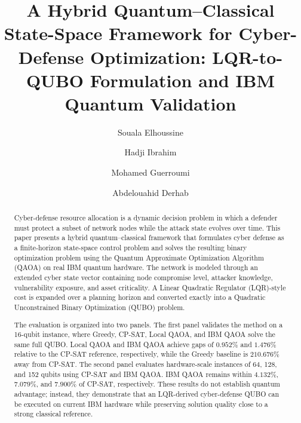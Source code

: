 \documentclass[runningheads]{llncs}
\begin{document}
\title{A Hybrid Quantum--Classical State-Space Framework for Cyber-Defense Optimization: LQR-to-QUBO Formulation and IBM Quantum Validation}


\author{
Souala Elhoussine \and
Hadji Ibrahim \and
Mohamed Guerroumi \and
Abdelouahid Derhab
}



\maketitle

\begin{abstract}
Cyber-defense resource allocation is a dynamic decision problem in which a defender must protect a subset of network nodes while the attack state evolves over time. This paper presents a hybrid quantum--classical framework that formulates cyber defense as a finite-horizon state-space control problem and solves the resulting binary optimization problem using the Quantum Approximate Optimization Algorithm (QAOA) on real IBM quantum hardware. The network is modeled through an extended cyber state vector containing node compromise level, attacker knowledge, vulnerability exposure, and asset criticality. A Linear Quadratic Regulator (LQR)-style cost is expanded over a planning horizon and converted exactly into a Quadratic Unconstrained Binary Optimization (QUBO) problem. 

The evaluation is organized into two panels. The first panel validates the method on a 16-qubit instance, where Greedy, CP-SAT, Local QAOA, and IBM QAOA solve the same full QUBO. Local QAOA and IBM QAOA achieve gaps of $0.952\%$ and $1.476\%$ relative to the CP-SAT reference, respectively, while the Greedy baseline is $210.676\%$ away from CP-SAT. The second panel evaluates hardware-scale instances of 64, 128, and 152 qubits using CP-SAT and IBM QAOA. IBM QAOA remains within $4.132\%$, $7.079\%$, and $7.900\%$ of CP-SAT, respectively. These results do not establish quantum advantage; instead, they demonstrate that an LQR-derived cyber-defense QUBO can be executed on current IBM hardware while preserving solution quality close to a strong classical reference.

\end{abstract}
\end{document}
